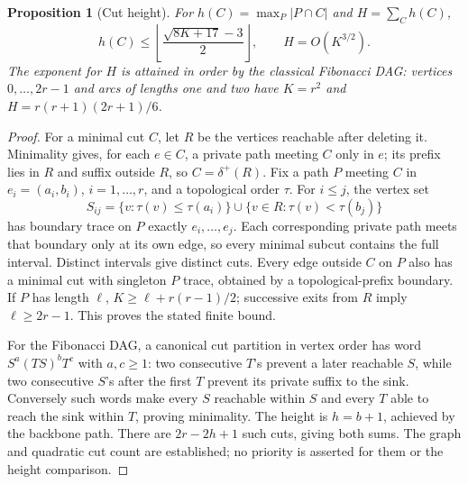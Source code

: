 \documentclass[11pt]{article}
\newtheorem{proposition}[theorem]{Proposition}
\theoremstyle{definition}\newtheorem{definition}[theorem]{Definition}
\theoremstyle{remark}\newtheorem{remark}[theorem]{Remark}
\begin{document}
\begin{proposition}[Cut height]\label{noise:height}
For $h(C)=\max_P|P\cap C|$ and $H=\sum_Ch(C)$,
\[
 h(C)\le\left\lfloor\frac{\sqrt{8K+17}-3}{2}\right\rfloor,
 \qquad H=O(K^{3/2}).
\]
The exponent for $H$ is attained in order by the classical Fibonacci DAG:
vertices $0,\ldots,2r-1$ and arcs of lengths one and two have
$K=r^2$ and $H=r(r+1)(2r+1)/6$.
\end{proposition}
\begin{proof}
For a minimal cut $C$, let $R$ be the vertices reachable after deleting it.
Minimality gives, for each $e\in C$, a private path meeting $C$ only in $e$;
its prefix lies in $R$ and suffix outside $R$, so $C=\delta^+(R)$.
Fix a path $P$ meeting $C$ in $e_i=(a_i,b_i)$, $i=1,\ldots,r$, and a
topological order $\tau$. For $i\le j$, the vertex set
\[
 S_{ij}=\{v:\tau(v)\le\tau(a_i)\}
       \cup\{v\in R:\tau(v)<\tau(b_j)\}
\]
has boundary trace on $P$ exactly $e_i,\ldots,e_j$. Each corresponding
private path meets that boundary only at its own edge, so every minimal
subcut contains the full interval. Distinct intervals give distinct cuts.
Every edge outside $C$ on $P$ also has a minimal cut with singleton $P$ trace,
obtained by a topological-prefix boundary. If $P$ has length $\ell$,
$K\ge\ell+r(r-1)/2$; successive exits from $R$ imply $\ell\ge2r-1$.
This proves the stated finite bound.

For the Fibonacci DAG, a canonical cut partition in vertex order has word
$S^a(TS)^bT^c$ with $a,c\ge1$: two consecutive $T$'s prevent a later
reachable $S$, while two consecutive $S$'s after the first $T$ prevent its
private suffix to the sink. Conversely such words make every $S$ reachable
within $S$ and every $T$ able to reach the sink within $T$, proving minimality.
The height is $h=b+1$, achieved by the backbone path. There are
$2r-2h+1$ such cuts, giving both sums. The graph and quadratic cut count
are established; no priority is asserted for them or the height comparison.
\end{proof}
\end{document}
